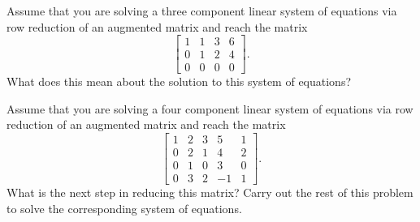 \documentclass{ximera}
\begin{document}
\begin{exercise}%
    Assume that you are solving a three component linear system of equations via row reduction of an augmented matrix and reach the matrix
    \begin{equation*}
        \left[ 
        \begin{array}{ccc|c}
            1 & 1 & 3 & 6 \\
            0 & 1 & 2 & 4 \\
            0 & 0 & 0 & 0
        \end{array}
        \right].
    \end{equation*}
    What does this mean about the solution to this system of equations?
\end{exercise}

\begin{exercise}
    Assume that you are solving a four component linear system of equations via row reduction of an augmented matrix and reach the matrix
    \begin{equation*}
        \left[ 
        \begin{array}{cccc|c}
            1 & 2 & 3 & 5 & 1 \\
            0 & 2 & 1 & 4 & 2 \\
            0 & 1 & 0 & 3 & 0 \\
            0 & 3 & 2 & -1 & 1
        \end{array}
        \right].
    \end{equation*}
    What is the next step in reducing this matrix? Carry out the rest of this problem to solve the corresponding system of equations. 
\end{exercise}
\end{document}
